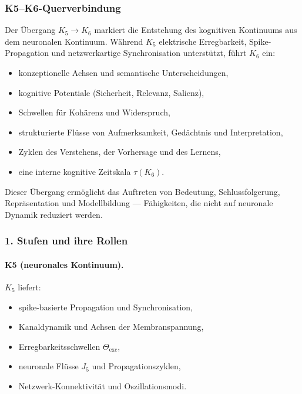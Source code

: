 
\subsubsection{K5–K6-Querverbindung}
\label{sec:crossk-k5-k6}

Der Übergang $K_5 \rightarrow K_6$ markiert die Entstehung des kognitiven
Kontinuums aus dem neuronalen Kontinuum. Während $K_5$ elektrische Erregbarkeit,
Spike-Propagation und netzwerkartige Synchronisation unterstützt, führt $K_6$ ein:
\begin{itemize}
  \item konzeptionelle Achsen und semantische Unterscheidungen,
  \item kognitive Potentiale (Sicherheit, Relevanz, Salienz),
  \item Schwellen für Kohärenz und Widerspruch,
  \item strukturierte Flüsse von Aufmerksamkeit, Gedächtnis und Interpretation,
  \item Zyklen des Verstehens, der Vorhersage und des Lernens,
  \item eine interne kognitive Zeitskala $\tau(K_6)$.
\end{itemize}

Dieser Übergang ermöglicht das Auftreten von Bedeutung, Schlussfolgerung,
Repräsentation und Modellbildung — Fähigkeiten, die nicht auf neuronale
Dynamik reduziert werden.

\subsubsection{1. Stufen und ihre Rollen}

\paragraph{K5 (neuronales Kontinuum).}
$K_5$ liefert:
\begin{itemize}
  \item spike-basierte Propagation und Synchronisation,
  \item Kanaldynamik und Achsen der Membranspannung,
  \item Erregbarkeitsschwellen $\Theta_{\mathrm{exc}}$,
  \item neuronale Flüsse $J_5$ und Propagationszyklen,
  \item Netzwerk-Konnektivität und Oszillationsmodi.
\end{itemize}

